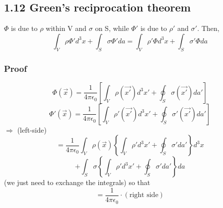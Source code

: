 \documentclass[12pt, a4paper]{article}
\begin{document}
	\subsection*{1.12 Green's reciprocation theorem}
	$\Phi$ is due to $\rho$ within V and $\sigma$ on S, while $\Phi'$ is due to $\rho'$ and $\sigma'$.
	Then,
	\[ \int_V \rho \Phi' d^3x + \int_S \sigma \Phi' da = \int_V \rho' \Phi d^3x + \int_S \sigma' \Phi da \]
	\subsubsection*{Proof}
	\[ \Phi(\vec{x}) = \frac{1}{4\pi\epsilon_0} \left[ \int_V \rho(\vec{x'}) d^3x' + \oint_S \sigma(\vec{x'}) da' \right] \]
	\[ \Phi'(\vec{x}) = \frac{1}{4\pi\epsilon_0} \left[ \int_V \rho'(\vec{x'}) d^3x' + \oint_S \sigma'(\vec{x'}) da' \right] \]
	$\Rightarrow$ (left-side)
	\[ = \frac{1}{4\pi\epsilon_0} \int_V \rho(\vec{x}) \left\{ \int_V \rho' d^3x' + \oint_S \sigma' da' \right\} d^3x \]
	\[ + \int_S \sigma \left\{ \int_V \rho' d^3x' + \oint_S \sigma' da' \right\} da \]
	(we just need to exchange the integrals)
	so that
	\[ = \frac{1}{4\pi\epsilon_0} \cdot (\text{right side}) \]
	
	
\end{document}
